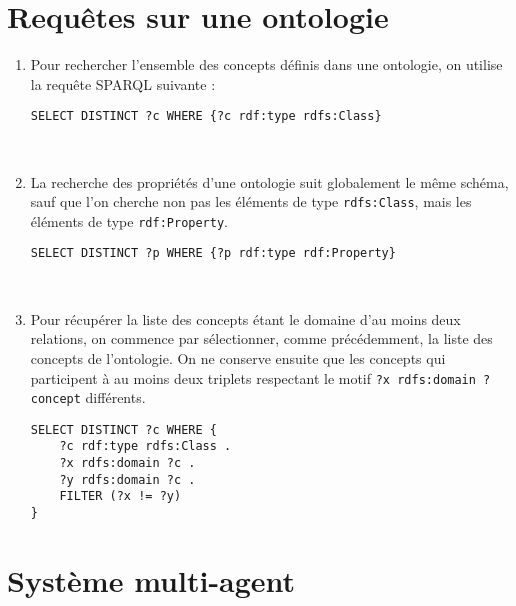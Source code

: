 \documentclass[a4paper,11pt]{article}
\begin{document}


\newpage
\section{Requêtes sur une ontologie}
\begin{enumerate}
\item Pour rechercher l'ensemble des concepts définis dans une ontologie, on utilise la requête SPARQL suivante :
\begin{lstlisting}[language=SPARQL]
SELECT DISTINCT ?c WHERE {?c rdf:type rdfs:Class}
\end{lstlisting}
~\\\vspace*{-.5cm}
\item La recherche des propriétés d'une ontologie suit globalement le même schéma, sauf que l'on cherche non pas les éléments de type \lstinline$rdfs:Class$, mais les éléments de type \lstinline$rdf:Property$.
\begin{lstlisting}[language=SPARQL]
SELECT DISTINCT ?p WHERE {?p rdf:type rdf:Property}
\end{lstlisting}
~\\\vspace*{-.5cm}
\item Pour récupérer la liste des concepts étant le domaine d'au moins deux relations, on commence par sélectionner, comme précédemment, la liste des concepts de l'ontologie.
On ne conserve ensuite que les concepts qui participent à au moins deux triplets respectant le motif \lstinline$?x rdfs:domain ?concept$ différents.
\begin{lstlisting}[language=SPARQL]
SELECT DISTINCT ?c WHERE {
	?c rdf:type rdfs:Class .
	?x rdfs:domain ?c .
	?y rdfs:domain ?c .
	FILTER (?x != ?y)
}
\end{lstlisting}
\end{enumerate}

\newpage
\section{Système multi-agent}
\end{document}
